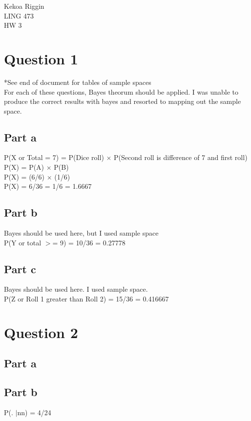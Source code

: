 \documentclass[11pt]{article}
\begin{document}
\noindent
Kekoa Riggin\\
LING 473\\
HW 3

\section*{Question 1}
\noindent
*See end of document for tables of sample spaces\\

\noindent
For each of these questions, Bayes theorum should be applied. I was unable to produce the correct results with bayes and resorted to mapping out the sample space. 

\subsection*{Part a}
\noindent
P(X or Total = 7) = P(Dice roll) $ \times $ P(Second roll is difference of 7 and first roll)\\
P(X) = P(A) $ \times $ P(B)\\
P(X) = (6/6) $ \times $ (1/6)\\
P(X) = 6/36 = 1/6 = 1.6667\\


\subsection*{Part b}
\noindent
Bayes should be used here, but I used sample space\\
P(Y or total $>$= 9) = 10/36 = 0.27778

\subsection*{Part c}
\noindent
Bayes should be used here. I used sample space.\\
P(Z or Roll 1 greater than Roll 2) = 15/36 = 0.416667

\section*{Question 2}

\subsection*{Part a}

\subsection*{Part b}
\noindent
P(. $|$nn) = 4/24
\end{document}
